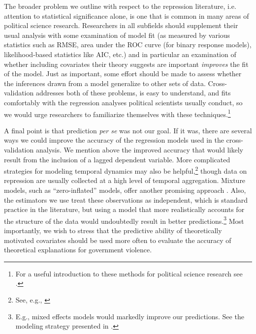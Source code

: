 \documentclass[12pt]{article}
\begin{document}
The broader problem we outline with respect to the repression literature, i.e. attention to statistical significance alone, is one that is common in many areas of political science research. Researchers in all subfields should supplement their usual analysis with some examination of model fit (as measured by various statistics such as RMSE, area under the ROC curve (for binary response models), likelihood-based statistics like AIC, etc.) and in particular an examination of whether including covariates their theory suggests are important {\em improves} the fit of the model. Just as important, some effort should be made to assess whether the inferences drawn from a model generalize to other sets of data. Cross-validation addresses both of these problems, is easy to understand, and fits comfortably with the regression analyses political scientists usually conduct, so we would urge researchers to familiarize themselves with these techniques.\footnote{For a useful introduction to these methods for political science research see \citet{LeeAhlquist2011}.} 

A final point is that prediction {\it per se} was not our goal. If it was, there are several ways we could improve the accuracy of the regression models used in the cross-validation analysis. We mention above the improved accuracy that would likely result from the inclusion of a lagged dependent variable. More complicated strategies for modeling temporal dynamics may also be helpful,\footnote{See, e.g., \citep{Brandtetal2011}} though data on repression are usually collected at a high level of temporal aggregation. Mixture models, such as ``zero-inflated'' models, offer another promising approach \citep[See, e.g.][]{Bagozzietal2013,Bagozzi2013}. Also, the estimators we use treat these observations as independent, which is standard practice in the literature, but using a model that more realistically accounts for the structure of the data would undoubtedly result in better predictions.\footnote{E.g., mixed effects models would markedly improve our predictions. See the modeling strategy presented in \citet{Wardetal2012}.} Most importantly, we wish to stress that the predictive ability of theoretically motivated covariates should be used more often to evaluate the accuracy of theoretical explanations for government violence.

\newpage
\begin{singlespace}


\end{singlespace}
\end{document}
